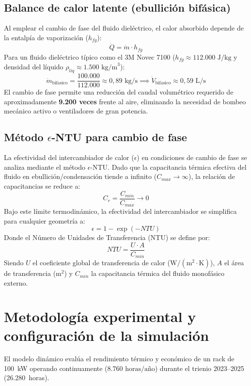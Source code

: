 \documentclass[journal]{IEEEtran}
\begin{document}
\subsection{Balance de calor latente (ebullici\'on bif\'asica)}
Al emplear el cambio de fase del fluido diel\'ectrico, el calor absorbido depende de la entalp\'ia de vaporizaci\'on ($h_{fg}$):
\begin{equation}
\dot{Q} = \dot{m} \cdot h_{fg}
\end{equation}
Para un fluido diel\'ectrico t\'ipico como el 3M Novec 7100 ($h_{fg} \approx 112.000\text{ J/kg}$ y densidad del l\'iquido $\rho_{liq} \approx 1.500\text{ kg/m}^3$):
\begin{equation}
\dot{m}_{\text{bifasico}} = \frac{100.000}{112.000} \approx 0,89\text{ kg/s} \implies \dot{V}_{\text{bifasico}} \approx 0,59\text{ L/s}
\end{equation}
El cambio de fase permite una reducci\'on del caudal volum\'etrico requerido de aproximadamente \textbf{9.200 veces} frente al aire, eliminando la necesidad de bombeo mec\'anico activo o ventiladores de gran potencia.

\subsection{M\'etodo \texorpdfstring{$\epsilon$}{epsilon}-NTU para cambio de fase}
La efectividad del intercambiador de calor ($\epsilon$) en condiciones de cambio de fase se analiza mediante el m\'etodo $\epsilon$-NTU. Dado que la capacitancia t\'ermica efectiva del fluido en ebullici\'on/condensaci\'on tiende a infinito ($C_{max} \to \infty$), la relaci\'on de capacitancias se reduce a:
\begin{equation}
C_r = \frac{C_{min}}{C_{max}} \to 0
\end{equation}
Bajo este l\'imite termodin\'amico, la efectividad del intercambiador se simplifica para cualquier geometr\'ia a:
\begin{equation}
\epsilon = 1 - \exp(-NTU)
\end{equation}
Donde el N\'umero de Unidades de Transferencia (NTU) se define por:
\begin{equation}
NTU = \frac{U \cdot A}{C_{min}}
\end{equation}
Siendo $U$ el coeficiente global de transferencia de calor ($\text{W}/(\text{m}^2\cdot\text{K})$), $A$ el \'area de transferencia ($\text{m}^2$) y $C_{min}$ la capacitancia t\'ermica del fluido monof\'asico externo.

\section{Metodolog\'ia experimental y configuraci\'on de la simulaci\'on}
El modelo din\'amico eval\'ua el rendimiento t\'ermico y econ\'omico de un rack de 100~kW operando continuamente ($8.760\text{ horas/a\~no}$) durante el trienio 2023--2025 (26.280~horas).
\end{document}
